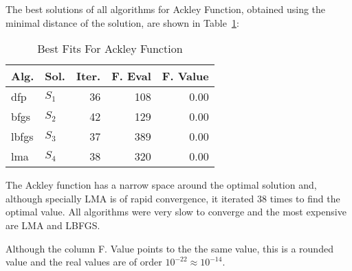 
The best solutions of all algorithms for Ackley Function, obtained using the minimal
distance of the solution, are shown in Table~\ref{solutions:ackley}:

\begin{table}[H]
\centering
\caption{Best Fits For Ackley Function}
\label{solutions:ackley}
\begin{tabular}{llrrr}
\toprule
 Alg. &    Sol. &  Iter. &  F. Eval &  F. Value \\
\midrule
  dfp & $S_{1}$ &     36 &      108 &      0.00 \\
 bfgs & $S_{2}$ &     42 &      129 &      0.00 \\
lbfgs & $S_{3}$ &     37 &      389 &      0.00 \\
  lma & $S_{4}$ &     38 &      320 &      0.00 \\
\bottomrule
\end{tabular}
\end{table}

The Ackley function has a narrow space around the optimal solution and,
although specially LMA is of rapid convergence, it iterated 38 times to find
the optimal value. All algorithms were very slow to converge and the most expensive
are LMA and LBFGS.

Although the column F. Value points to the the same value, this is a rounded value
and the real values are of order $10^{-22} \approx 10^{-14}$.

